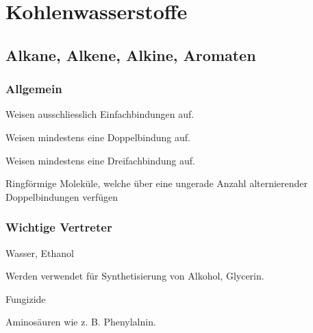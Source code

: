 \section{Kohlenwasserstoffe}

\subsection{Alkane, Alkene, Alkine, Aromaten}

\subsubsection{Allgemein}

\begin{definition}[Alkane]
	Weisen ausschliesslich Einfachbindungen auf.
\end{definition}

\begin{definition}[Alkene]
	Weisen mindestens eine Doppelbindung auf.
\end{definition}

\begin{definition}[Alkine]
	Weisen mindestens eine Dreifachbindung auf.
\end{definition}

\begin{definition}[Aromate]
	Ringförmige Moleküle, welche über eine ungerade Anzahl alternierender Doppelbindungen verfügen
\end{definition}

\subsubsection{Wichtige Vertreter}

\begin{definition}
	Wasser, Ethanol
\end{definition}

\begin{definition}
	Werden verwendet für Synthetisierung von Alkohol, Glycerin.
\end{definition}

\begin{definition}
	Fungizide
\end{definition}

\begin{definition}
	Aminosäuren wie z. B. Phenylalnin. \\
	
	\setatomsep{2.2em}
\end{definition}

